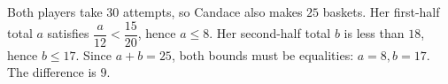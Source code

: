 Both players take $30$ attempts, so Candace also makes $25$ baskets. Her first-half total $a$ satisfies $\dfrac{a}{12}<\dfrac{15}{20}$, hence $a\le8$. Her second-half total $b$ is less than $18$, hence $b\le17$. Since $a+b=25$, both bounds must be equalities: $a=8,b=17$. The difference is $\boxed9$.
